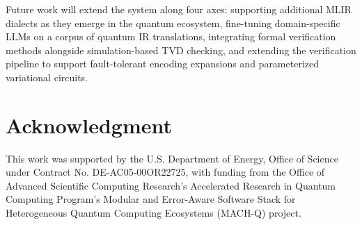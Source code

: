 \documentclass[conference]{IEEEtran}
\begin{document}
Future work will extend the system along four axes: supporting additional MLIR dialects as they emerge in the quantum ecosystem, fine-tuning domain-specific LLMs on a corpus of quantum IR translations, integrating formal verification methods alongside simulation-based TVD checking, and extending the verification pipeline to support fault-tolerant encoding expansions and parameterized variational circuits.

\section*{Acknowledgment}

This work was supported by the U.S. Department of Energy, Office of Science under Contract No. DE-AC05-00OR22725, with funding from the Office of Advanced Scientific Computing Research's Accelerated Research in Quantum Computing Program's Modular and Error-Aware Software Stack for Heterogeneous Quantum Computing Ecosystems (MACH-Q) project.





\end{document}
